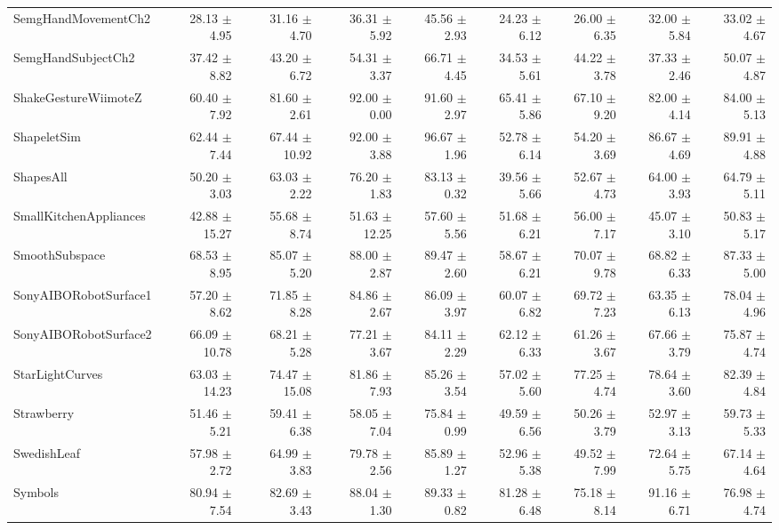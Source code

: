 \begin{landscape}
\begin{longtable}{lrrrrrrrr}
SemgHandMovementCh2 & 28.13 $\pm$ 4.95 & 31.16 $\pm$ 4.70 & 36.31 $\pm$ 5.92 & 45.56 $\pm$ 2.93 & 24.23 $\pm$ 6.12 & 26.00 $\pm$ 6.35 & 32.00 $\pm$ 5.84 & 33.02 $\pm$ 4.67 \\
SemgHandSubjectCh2 & 37.42 $\pm$ 8.82 & 43.20 $\pm$ 6.72 & 54.31 $\pm$ 3.37 & 66.71 $\pm$ 4.45 & 34.53 $\pm$ 5.61 & 44.22 $\pm$ 3.78 & 37.33 $\pm$ 2.46 & 50.07 $\pm$ 4.87 \\
ShakeGestureWiimoteZ & 60.40 $\pm$ 7.92 & 81.60 $\pm$ 2.61 & 92.00 $\pm$ 0.00 & 91.60 $\pm$ 2.97 & 65.41 $\pm$ 5.86 & 67.10 $\pm$ 9.20 & 82.00 $\pm$ 4.14 & 84.00 $\pm$ 5.13 \\
ShapeletSim & 62.44 $\pm$ 7.44 & 67.44 $\pm$ 10.92 & 92.00 $\pm$ 3.88 & 96.67 $\pm$ 1.96 & 52.78 $\pm$ 6.14 & 54.20 $\pm$ 3.69 & 86.67 $\pm$ 4.69 & 89.91 $\pm$ 4.88 \\
ShapesAll & 50.20 $\pm$ 3.03 & 63.03 $\pm$ 2.22 & 76.20 $\pm$ 1.83 & 83.13 $\pm$ 0.32 & 39.56 $\pm$ 5.66 & 52.67 $\pm$ 4.73 & 64.00 $\pm$ 3.93 & 64.79 $\pm$ 5.11 \\
SmallKitchenAppliances & 42.88 $\pm$ 15.27 & 55.68 $\pm$ 8.74 & 51.63 $\pm$ 12.25 & 57.60 $\pm$ 5.56 & 51.68 $\pm$ 6.21 & 56.00 $\pm$ 7.17 & 45.07 $\pm$ 3.10 & 50.83 $\pm$ 5.17 \\
SmoothSubspace & 68.53 $\pm$ 8.95 & 85.07 $\pm$ 5.20 & 88.00 $\pm$ 2.87 & 89.47 $\pm$ 2.60 & 58.67 $\pm$ 6.21 & 70.07 $\pm$ 9.78 & 68.82 $\pm$ 6.33 & 87.33 $\pm$ 5.00 \\
SonyAIBORobotSurface1 & 57.20 $\pm$ 8.62 & 71.85 $\pm$ 8.28 & 84.86 $\pm$ 2.67 & 86.09 $\pm$ 3.97 & 60.07 $\pm$ 6.82 & 69.72 $\pm$ 7.23 & 63.35 $\pm$ 6.13 & 78.04 $\pm$ 4.96 \\
SonyAIBORobotSurface2 & 66.09 $\pm$ 10.78 & 68.21 $\pm$ 5.28 & 77.21 $\pm$ 3.67 & 84.11 $\pm$ 2.29 & 62.12 $\pm$ 6.33 & 61.26 $\pm$ 3.67 & 67.66 $\pm$ 3.79 & 75.87 $\pm$ 4.74 \\
StarLightCurves & 63.03 $\pm$ 14.23 & 74.47 $\pm$ 15.08 & 81.86 $\pm$ 7.93 & 85.26 $\pm$ 3.54 & 57.02 $\pm$ 5.60 & 77.25 $\pm$ 4.74 & 78.64 $\pm$ 3.60 & 82.39 $\pm$ 4.84 \\
Strawberry & 51.46 $\pm$ 5.21 & 59.41 $\pm$ 6.38 & 58.05 $\pm$ 7.04 & 75.84 $\pm$ 0.99 & 49.59 $\pm$ 6.56 & 50.26 $\pm$ 3.79 & 52.97 $\pm$ 3.13 & 59.73 $\pm$ 5.33 \\
SwedishLeaf & 57.98 $\pm$ 2.72 & 64.99 $\pm$ 3.83 & 79.78 $\pm$ 2.56 & 85.89 $\pm$ 1.27 & 52.96 $\pm$ 5.38 & 49.52 $\pm$ 7.99 & 72.64 $\pm$ 5.75 & 67.14 $\pm$ 4.64 \\
Symbols & 80.94 $\pm$ 7.54 & 82.69 $\pm$ 3.43 & 88.04 $\pm$ 1.30 & 89.33 $\pm$ 0.82 & 81.28 $\pm$ 6.48 & 75.18 $\pm$ 8.14 & 91.16 $\pm$ 6.71 & 76.98 $\pm$ 4.74 \\

\end{longtable}
\end{landscape}
